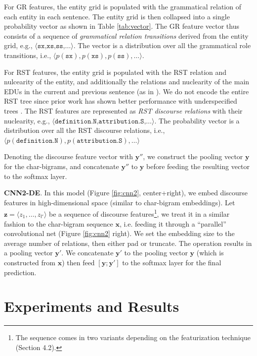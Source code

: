 For GR features, the entity grid is populated with the grammatical relation of each entity in each sentence. The entity grid is then collapsed into a single probability vector as shown in Table \ref{tab:vector}. The GR feature vector thus consists of a sequence of \emph{grammatical relation transitions} derived from the entity grid,
e.g., $\langle\texttt{sx,xs,ss,\ldots}\rangle$. The vector is a distribution over all the grammatical role transitions, i.e., $\langle p(\texttt{sx}),p(\texttt{xs}),p(\texttt{ss}),\ldots\rangle$.

For RST features, the entity grid is populated with the RST relation and nulcearity of the entity, and additionally the relations and nuclearity of  the main EDUs in the current and previous sentence (as in ). We do not encode the entire RST tree since prior work has shown better performance with underspecified trees \cite{Ji:2017, Hogenboom:2015}. The RST features are represented as \emph{RST discourse relations} with their nuclearity,
e.g., $\langle\texttt{definition.N,attribution.S,\ldots}\rangle$.
The probability vector is a distribution over all the RST discourse relations, i.e., $\langle p(\texttt{definition.N}),p(\texttt{attribution.S}),\ldots\rangle$

Denoting the discourse feature vector with $\bm{y}''$, we construct the pooling vector $\bm{y}$ for the char-bigrams, and concatenate $\bm{y}''$ to $\bm{y}$ before feeding the resulting vector to the softmax layer. 
\medskip

\noindent
\textbf{CNN2-DE}.
In this model (Figure \ref{fig:cnn2}, center+right), we embed discourse features in high-dimensional space (similar to char-bigram embeddings).
Let $\bm{z} = \langle z_1,\ldots,z_{l'}\rangle$ be a sequence of discourse features\footnote{The sequence comes in two variants depending on the featurization technique (Section 4.2).}, we treat it in a similar fashion to the char-bigram sequence $\bm{x}$, i.e. feeding it through a ``parallel'' convolutional net (Figure \ref{fig:cnn2} right). We set the embedding size to the average number of relations, then either pad or truncate.
The operation results in a pooling vector $\bm{y}'$.
We concatenate $\bm{y}'$ to the pooling vector $\bm{y}$ (which is constructed from $\bm{x}$) then feed $[\bm{y};\bm{y}']$ to the softmax layer for the final prediction.


\medskip

\section{Experiments and Results}
\label{sec:experiments-and-results}

